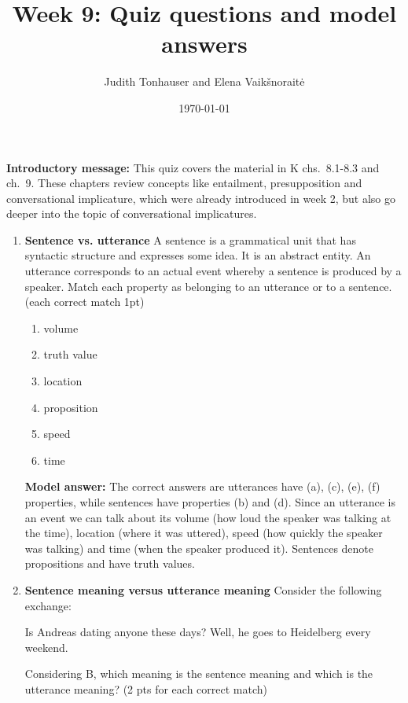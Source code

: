 \documentclass[a4,11pt]{article}
\title{Week 9: Quiz questions and model answers}
\author{Judith Tonhauser and Elena Vaik\v snorait\.{e} }
\date{\today}
\newcommand{\6}{\mbox{$[\hspace*{-.6mm}[$}}
\newcommand{\9}{\mbox{$]\hspace*{-.6mm}]$}}
\begin{document}
\maketitle

{\bf Introductory message:} This quiz covers the material in K chs.\ 8.1-8.3 and ch.\ 9. These chapters review concepts like entailment, presupposition and conversational implicature, which were already introduced in week 2, but also go deeper into the topic of conversational implicatures.

\begin{enumerate}[leftmargin = 12pt]

\item { \bf Sentence vs. utterance} A sentence is a grammatical unit that has syntactic structure and expresses some idea. It is an abstract entity. An utterance corresponds to an actual event whereby a sentence is produced by a speaker. Match each property as belonging to an utterance or to a sentence. (each correct match 1pt)

\begin{enumerate}[noitemsep]
\item volume
\item truth value
\item location
\item proposition
\item speed
\item time
\end{enumerate}

{ \bf Model answer:} The correct answers are utterances have (a), (c), (e), (f) properties, while sentences have properties (b) and (d). Since an utterance is an event we can talk about its volume (how loud the speaker was talking at the time), location (where it was uttered), speed (how quickly the speaker was talking) and time (when the speaker produced it). Sentences denote propositions and have truth values.



\item {\bf Sentence meaning versus utterance meaning}  Consider the following exchange:

\begin{exe}
 Is Andreas dating anyone these days?
 Well, he goes to Heidelberg every weekend.
\end{exe}

Considering B, which meaning is the sentence meaning and which is the utterance meaning? (2 pts for each correct match)


\end{enumerate}
\end{document}

